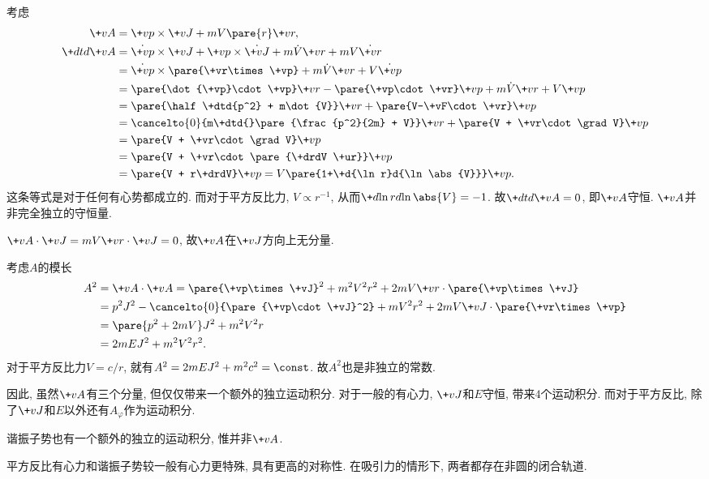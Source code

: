 \documentclass{ctexart}
\begin{document}
考虑
\begin{align*}
    \+vA &= \+vp \times \+vJ + mV\pare{r} \+vr,\\
    \+dtd{\+vA} &= \dot{\+vp}\times\+vJ + \+vp\times\dot{\+vJ} + m\dot{V}\+vr + mV\dot{\+vr} \\
    &= \dot{\+vp}\times\pare{\+vr\times\+vp} + m\dot{V}\+vr + V\dot{\+vp} \\
    &= \pare{\dot{\+vp}\cdot\+vp}\+vr - \pare{\+vp\cdot\+vr}\+vp + m\dot{V}\+vr + V\+vp \\
    &= \pare{\half \+dtd{p^2} + m\dot{V}}\+vr + \pare{V-\+vF\cdot\+vr}\+vp \\
    &= \cancelto{0}{m\+dtd{}\pare{\frac{p^2}{2m} + V}}\+vr + \pare{V + \+vr\cdot\grad V}\+vp \\
    &= \pare{V + \+vr\cdot\grad V}\+vp \\
    &= \pare{V + \+vr\cdot\pare{\+drdV \+ur}}\+vp \\
    &= \pare{V + r\+drdV}\+vp = V\pare{1+\+d{\ln r}d{\ln \abs{V}}}\+vp.
\end{align*}
这条等式是对于任何有心势都成立的. 而对于平方反比力, $V\propto r^{-1}$, 从而$\displaystyle \+d{\ln r}d{\ln\abs{V}} = -1$. 故$\displaystyle \+dtd{\+vA} = 0$, 即$\+vA$守恒. $\+vA$并非完全独立的守恒量.
\begin{cenum}
    \item $\+vA\cdot\+vJ = mV\+vr\cdot\+vJ = 0$, 故$\+vA$在$\+vJ$方向上无分量.
    \item 考虑$A$的模长
    \begin{align*}
        A^2 &= \+vA\cdot \+vA = \pare{\+vp\times\+vJ}^2 + m^2V^2r^2 + 2mV\+vr\cdot\pare{\+vp\times\+vJ} \\
        &= p^2J^2 - \cancelto{0}{\pare{\+vp\cdot\+vJ}^2} + mV^2r^2 + 2mV\+vJ\cdot\pare{\+vr\times\+vp} \\
        &= \pare{p^2 + 2mV}J^2 + m^2V^2 r \\
        &= 2mEJ^2 + m^2V^2r^2.
    \end{align*}
    对于平方反比力$V = c/r$, 就有$A^2 = 2mEJ^2 + m^2c^2 = \const$. 故$A^2$也是非独立的常数.
\end{cenum}
因此, 虽然$\+vA$有三个分量, 但仅仅带来一个额外的独立运动积分. 对于一般的有心力, $\+vJ$和$E$守恒, 带来$4$个运动积分. 而对于平方反比, 除了$\+vJ$和$E$以外还有$A_\varphi$作为运动积分.
\begin{remark}
    谐振子势也有一个额外的独立的运动积分, 惟并非$\+vA$.
\end{remark}
平方反比有心力和谐振子势较一般有心力更特殊, 具有更高的对称性. 在吸引力的情形下, 两者都存在非圆的闭合轨道.
\end{document}
